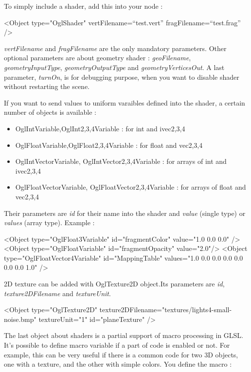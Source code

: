 To simply include a shader, add this into your node :
	\begin{code_xml}
		<Object type="OglShader" vertFilename=``test.vert'' fragFilename=``test.frag'' />
	\end{code_xml}

\textit{vertFilename} and \textit{fragFilename} are the only mandatory parameters. Other optional parameters are about geometry shader : \textit{geoFilename}, \textit{geometryInputType}, \textit{geometryOutputType} and \textit{geometryVerticesOut}. A last parameter, \textit{turnOn}, is for debugging purpose, when you want to disable shader without restarting the scene.

If you want to send values to uniform varaibles defined into the shader, a certain number of objects is available : 
\begin{itemize}
 \item OglIntVariable,OglInt{2,3,4}Variable : for int and ivec{2,3,4}
 \item OglFloatVariable,OglFloat{2,3,4}Variable : for float and vec{2,3,4}
 \item OglIntVectorVariable, OglIntVector{2,3,4}Variable : for arrays of int and ivec{2,3,4}
 \item OglFloatVectorVariable, OglFloatVector{2,3,4}Variable : for arrays of float and vec{2,3,4}
\end{itemize}

Their parameters are \textit{id} for their name into the shader and \textit{value} (single type) or \textit{values} (array type).
Example : 
	\begin{code_xml}
		<Object type="OglFloat3Variable" id="fragmentColor" value="1.0 0.0 0.0" />
		<Object type="OglFloatVariable" id="fragmentOpacity" value="2.0"/>
		<Object type="OglFloatVector4Variable" id="MappingTable" values="1.0 0.0 0.0 0.0 0.0 0.0 0.0 1.0" />
	\end{code_xml}

2D texture can be added with OglTexture2D object.Its parameters are \textit{id}, \textit{texture2DFilename} and \textit {textureUnit}.

	\begin{code_xml} 
		<Object type="OglTexture2D" texture2DFilename="textures/lights4-small-noise.bmp" textureUnit="1" id="planeTexture" />
	\end{code_xml}

The last object about shaders is a partial support of macro processing in GLSL. It's possible to define macro variable if a part of code is enabled or not. For example, this can be very useful if there is a common code for two 3D objects, one with a texture, and the other with simple colors. You define the macro :


